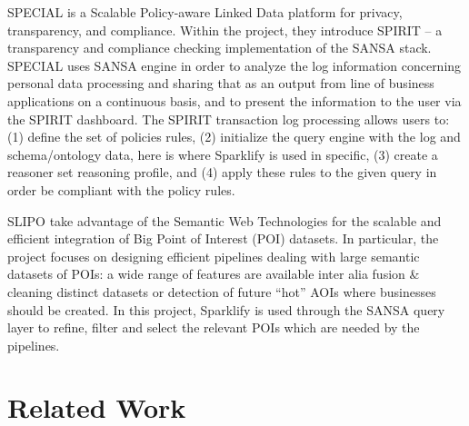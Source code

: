 SPECIAL is a Scalable Policy-aware Linked Data platform for privacy, transparency, and compliance.
Within the project, they introduce SPIRIT -- a transparency and compliance checking implementation of the SANSA stack.
SPECIAL uses SANSA engine in order to analyze the log information concerning personal data processing and sharing that as an output from line of business applications on a continuous basis, and to present the information to the user via the SPIRIT dashboard.
The SPIRIT transaction log processing allows users to: (1) define the set of policies rules, (2) initialize the query engine with the log and schema/ontology data, here is where Sparklify is used in specific, (3) create a reasoner set reasoning profile, and (4) apply these rules to the given query in order be compliant with the policy rules.

 SLIPO take advantage of the Semantic Web Technologies for the scalable and efficient integration of Big Point of Interest (POI) datasets.
In particular, the project focuses on designing efficient pipelines dealing with large semantic datasets of POIs: a wide range of features are available inter alia fusion \& cleaning distinct datasets or detection of future ``hot'' AOIs where businesses should be created.
In this project, Sparklify is used through the SANSA query layer to refine, filter and select the relevant POIs which are needed by the pipelines.







\section{Related Work}
\label{sec:related_work}

